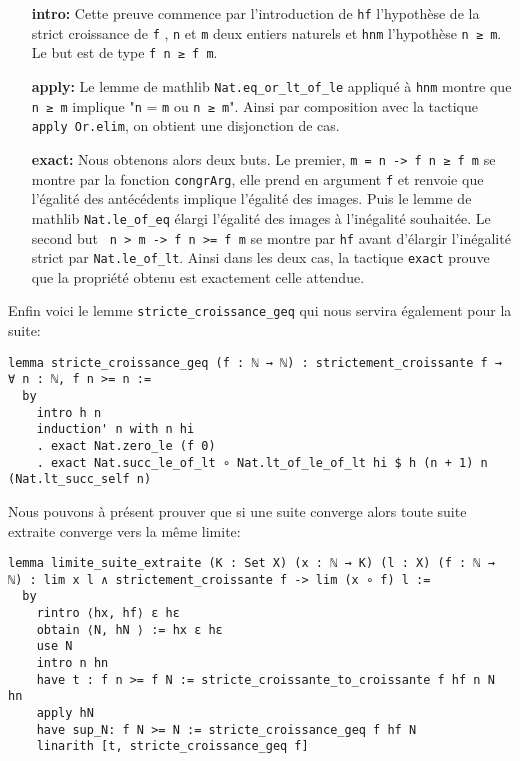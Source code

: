 \documentclass[a4paper, 12pt]{article}
\newcommand{\lean}[1]{\texttt{#1}}
\begin{document}
\begin{itemize}[align=left,itemsep=20pt]
    \item[\textbf{intro:}] Cette preuve commence par l'introduction de \lean{hf} l'hypothèse de la strict croissance de \lean{f} , \lean{n} et \lean{m} deux entiers naturels et
    \lean{hnm} l'hypothèse \lean{n ≥ m}. Le but est de type \lean{f n ≥ f m}.

    \item[\textbf{apply:}] Le lemme de mathlib \lean{Nat.eq_or_lt_of_le} appliqué à \lean{hnm} montre que \lean{n ≥ m} implique "\lean{n} = \lean{m} ou \lean{n ≥ m}". Ainsi par composition avec la tactique \lean{apply Or.elim}, on obtient une disjonction de cas.

    \item[\textbf{exact:}] Nous obtenons alors deux buts. Le premier, \lean{m = n -> f n ≥ f m} se montre par la fonction \lean{congrArg}, elle prend en argument \lean{f} et renvoie
    que l'égalité des antécédents implique l'égalité des images. Puis le lemme de mathlib \lean{Nat.le_of_eq} élargi l'égalité des images à l'inégalité souhaitée. Le second but \lean{
    n > m -> f n >= f m} se montre par \lean{hf} avant d'élargir l'inégalité strict par \lean{Nat.le_of_lt}. Ainsi dans les deux cas, la tactique \lean{exact} prouve que la propriété
    obtenu est exactement celle attendue.



\end{itemize}


\vspace{\baselineskip}

Enfin voici le lemme \lean{stricte_croissance_geq} qui nous servira également pour la suite:

\begin{verbatim}
lemma stricte_croissance_geq (f : ℕ → ℕ) : strictement_croissante f → ∀ n : ℕ, f n >= n :=
  by
    intro h n
    induction' n with n hi
    . exact Nat.zero_le (f 0)
    . exact Nat.succ_le_of_lt ∘ Nat.lt_of_le_of_lt hi $ h (n + 1) n (Nat.lt_succ_self n)
\end{verbatim}


Nous pouvons à présent prouver que si une suite converge alors toute suite extraite converge vers la même limite:

\begin{verbatim}
lemma limite_suite_extraite (K : Set X) (x : ℕ → K) (l : X) (f : ℕ → ℕ) : lim x l ∧ strictement_croissante f -> lim (x ∘ f) l :=
  by
    rintro ⟨hx, hf⟩ ε hε
    obtain ⟨N, hN ⟩ := hx ε hε
    use N
    intro n hn
    have t : f n >= f N := stricte_croissante_to_croissante f hf n N hn
    apply hN
    have sup_N: f N >= N := stricte_croissance_geq f hf N
    linarith [t, stricte_croissance_geq f]

\end{verbatim}
\end{document}
